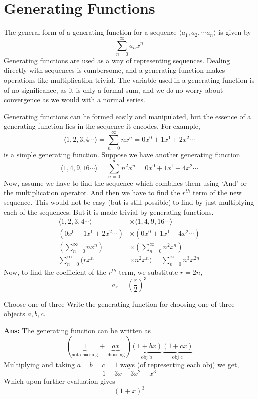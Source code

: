 \chapter{Generating Functions}
The general form of a generating function for a sequence \mbox{$\langle a_1, a_2, \cdots a_n\rangle$} is given by
\[
    \sum_{n=0}^{\infty}a_n x^n
\]
Generating functions are used as a way of representing sequences. Dealing directly with sequences is cumbersome, and a generating function makes operations like multiplication trivial. The variable used in a generating function is of no significance, as it is only a formal sum, and we do no worry about convergence as we would with a normal series.

Generating functions can be formed easily and manipulated, but the essence of a generating function lies in the sequence it encodes. For example,
\[
    \langle1,2,3,4\cdots\rangle = \sum_{n=0}^{\infty} nx^n = 0x^0 + 1x^1 + 2x^2 \cdots
\]
is a simple generating function. Suppose we have another generating function
\[
    \langle1,4,9,16 \cdots\rangle =  \sum_{n=0}^{\infty} n^2x^n = 0x^0 + 1x^1 + 4x^2 \cdots
\]
Now, assume we have to find the sequence which combines them using `And' or the multiplication operator. And then we have to find the \mbox{$r^{th}$} term of the new sequence. This would not be easy (but is still possible) to find by just multiplying each of the sequences. But it is made trivial by generating functions.
\begin{align*}
    \langle1,2,3,4\cdots\rangle & \times \langle1,4,9,16 \cdots\rangle  \\
    (0x^0 + 1x^1 + 2x^2 \cdots) & \times (0x^0 + 1x^1 + 4x^2 \cdots)    \\
    (\sum_{n=0}^{\infty} nx^n)  & \times (\sum_{n=0}^{\infty} n^2x^n)\, \\
    \sum_{n=0}^{\infty} (nx^n   & \times n^2 x^n)
    = \sum_{n=0}^{\infty} n^3 x^{2n}
\end{align*}
Now, to find the coefficient of the \mbox{$r^{th}$} term, we substitute \mbox{$r = 2n$},
\[
    a_r = {\left(\frac{r}{2}\right)}^3
\]

\begin{exampletcb}{Choose one of three}{}
    Write the generating function for choosing one of three objects \mbox{$a,b,c$}.

    \textbf{Ans:} The generating function can be written as
    \[
        (\underbrace{1}_{\text{not choosing}}+\underbrace{ax}_{\text{choosing}})\underbrace{(1+bx)}_{\text{obj b}}\underbrace{(1+cx)}_{\text{obj c}}
    \]
    Multiplying and taking \mbox{$a=b=c=1$} ways (of representing each obj) we get,
    \[
        1+3x+3x^2+x^3
    \]
    Which upon further evaluation gives
    \[
        {(1+x)}^3
    \]
\end{exampletcb}

